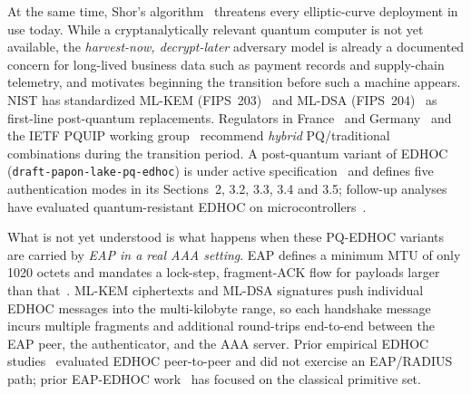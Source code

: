 \documentclass{easychair}
\begin{document}
At the same time, Shor's algorithm~\cite{shor1994algorithms} threatens
every elliptic-curve deployment in use today. While a
cryptanalytically relevant quantum computer is not yet available, the
\emph{harvest-now, decrypt-later} adversary model is already a
documented concern for long-lived business data such as payment
records and supply-chain telemetry, and motivates beginning the
transition before such a machine appears. NIST has standardized ML-KEM
(FIPS~203)~\cite{FIPS203} and ML-DSA (FIPS~204)~\cite{FIPS204} as
first-line post-quantum replacements. Regulators
in France~\cite{ANSSI} and Germany~\cite{TR-02102-1} and the IETF PQUIP working
group~\cite{PQUIP} recommend \emph{hybrid} PQ/traditional combinations during
the transition period. A post-quantum variant of EDHOC
(\texttt{draft-papon-lake-pq-edhoc}) is under active
specification~\cite{pq-edhoc-draft} and defines five authentication modes
in its Sections~2, 3.2, 3.3, 3.4 and 3.5; follow-up analyses have evaluated
quantum-resistant EDHOC on microcontrollers~\cite{FTK+25,FKF25}.

What is not yet understood is what happens when these PQ-EDHOC variants are
carried by \emph{EAP in a real AAA setting}. EAP defines a minimum
MTU of only 1020 octets and mandates a lock-step, fragment-ACK flow for
payloads larger than that~\cite{RFC3748,RFC9191}. ML-KEM ciphertexts and
ML-DSA signatures push individual EDHOC messages into the multi-kilobyte
range, so each handshake message incurs multiple fragments and additional
round-trips end-to-end between the EAP peer, the authenticator, and the
AAA server. Prior empirical EDHOC studies~\cite{FVW24,FTK+25,FKF25}
evaluated EDHOC peer-to-peer and did not exercise an EAP/RADIUS path; prior
EAP-EDHOC work~\cite{RFC-EAP-EDHOC,LopezGomez2026} has focused on the
classical primitive set.
\end{document}
